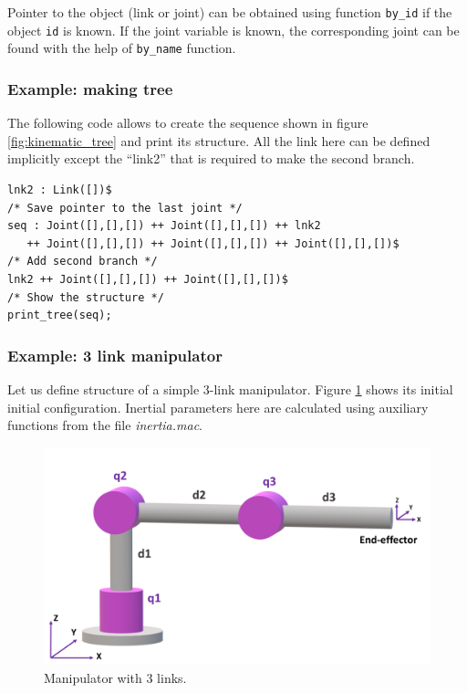 \documentclass{article}
\begin{document}
Pointer to the object (link or joint) can be obtained using function \texttt{by\_id} if the object \texttt{id} is known. If the joint variable is known, the corresponding joint can be found with the help of \texttt{by\_name} function. 

\subsubsection{Example: making tree}

The following code allows to create the sequence shown in figure \ref{fig:kinematic_tree} and print its structure. All the link here can be defined implicitly except the ``link2'' that is required to make the second branch. 
\begin{verbatim}
lnk2 : Link([])$ 
/* Save pointer to the last joint */
seq : Joint([],[],[]) ++ Joint([],[],[]) ++ lnk2 
   ++ Joint([],[],[]) ++ Joint([],[],[]) ++ Joint([],[],[])$
/* Add second branch */
lnk2 ++ Joint([],[],[]) ++ Joint([],[],[])$
/* Show the structure */
print_tree(seq);
\end{verbatim}

\subsubsection{Example: 3 link manipulator}
\label{ex:3link}

Let us define structure of a simple 3-link manipulator. Figure \ref{fig:3_links} shows its initial initial configuration. Inertial parameters here are calculated using auxiliary functions from the file \textit{inertia.mac}.  

\begin{figure}[t]
    \centering
    \includegraphics[width=0.8\linewidth]{img/scheme_jnt.png}
    \caption{Manipulator with 3 links.}
    \label{fig:3_links}
\end{figure}
\end{document}
